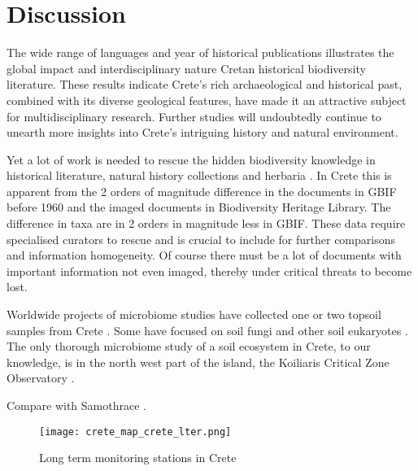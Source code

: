 \section{Discussion}\label{crete_idea_discussion}

The wide range of languages and year of historical publications illustrates the
global impact and interdisciplinary nature Cretan historical biodiversity literature.
These results indicate Crete's rich archaeological and historical past,
combined with its diverse geological features, have made it an attractive subject
for multidisciplinary research. Further studies will undoubtedly continue to
unearth more insights into Crete's intriguing history and natural environment.

Yet a lot of work is needed to rescue the hidden biodiversity knowledge in
historical literature, natural history collections and herbaria \parencite{Paragkamian2022}.
In Crete this is apparent from the 2 orders of magnitude difference in the documents
in GBIF before 1960 and the imaged documents in Biodiversity Heritage Library. The 
difference in taxa are in 2 orders in magnitude less in GBIF. These data 
require specialised curators to rescue and is crucial to include for 
further comparisons and information homogeneity. Of course there must be 
a lot of documents with important information not even imaged, thereby under 
critical threats to become lost.

Worldwide projects of microbiome studies have collected one or two topsoil
samples from Crete \parencite{Vasar2022, Labouyrie2023, Bahram2018, Orgiazzi2018}.
Some have focused on soil fungi \parencite{Mikryukov2023, Davison2021, Tedersoo2021}
and other soil eukaryotes \parencite{Aslani2022}.
The only thorough microbiome study of a soil ecosystem in Crete, to our knowledge,
is in the north west part of the island, the Koiliaris Critical Zone Observatory \parencite{tsiknia2014}.

Compare with Samothrace \parencite{noll2024insights}.

\begin{figure}[hbt!] 
    \centering\texttt{[image: crete\_map\_crete\_lter.png]}
    \caption[LTERs in Crete]{Long term monitoring stations in Crete}
    \label{fig:crete-lter}
\end{figure}

